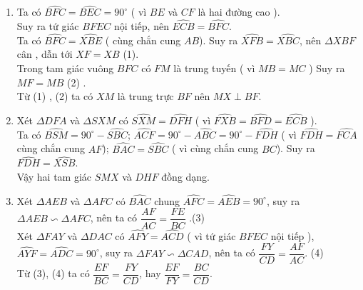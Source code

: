 \begin{ex}
{\begin{center}
\begin{tikzpicture}
    \end{tikzpicture}
    \end{center}
  \begin{enumerate}
  \item Ta có $\widehat{ BFC} = \widehat{ BEC} = 90^\circ$ ( vì $BE$ và $CF$ là hai đường cao ).\\
Suy ra tứ giác $BFEC$ nội tiếp, nên $\widehat{ ECB} = \widehat{BFC}$.\\ 
Ta có  $\widehat{BFC} = \widehat{XBE}$ ( cùng chắn cung $AB$). 
Suy ra $\widehat{ XFB}= \widehat{ XBC}$, nên $\Delta XBF$ cân , dẫn tới $XF = XB$ \hfill (1).\\
Trong tam giác vuông $BFC$ có $FM$ là trung tuyến ( vì $MB = MC$ )
 Suy ra $MF = MB$ \hfill (2) .\\
Từ (1) , (2) ta  có $XM$ là trung trực $BF$ nên $MX \perp BF$.
\item  Xét $\Delta DFA$ và $\Delta SXM$ có $\widehat{SXM}  = \widehat{ DFH}$ ( vì $\widehat{FXB} = \widehat{ BFD} = \widehat{ECB}$ ).\\
 Ta có $\widehat{BSM} = 90^\circ - \widehat{ SBC}$; 
     $\widehat{ ACF} = 90^\circ - \widehat{ ABC}  = 90^\circ - \widehat{ FDH}$ ( vì $\widehat{ FDH} =\widehat{ FCA}$ cùng chắn cung $AF$);
$  \widehat{BAC} = \widehat{ SBC}$ ( vì cùng chắn cung $BC$).
Suy ra  $\widehat{ FDH} = \widehat{XSB}$. \\ Vậy hai tam giác $SMX$ và $DHF$ đồng dạng.
\item Xét $\Delta{AEB}$ và $\Delta{AFC}$ có $\widehat{ BAC}$ chung 
$\widehat{AFC} = \widehat{AEB} = 90^\circ$, suy ra $\Delta AEB  \backsim \Delta AFC$, nên ta có $\dfrac{AF}{AC}=\dfrac{FE}{BC}$ .\hfill (3)\\
Xét $\Delta FAY$ và $\Delta DAC$ có $\widehat{ AFY} = \widehat{ ACD}$ ( vì tứ giác $BFEC$ nội tiếp ), $\widehat{AYF} = \widehat{ADC} = 90^\circ$, suy ra  
$\Delta FAY  \backsim \Delta CAD$, nên ta có $\dfrac{FY}{CD}=\dfrac{AF}{AC}$. \hfill (4)\\
 Từ (3), (4) ta có $\dfrac{EF}{BC}=\dfrac{FY}{CD}$, hay $\dfrac{EF}{FY}=\dfrac{BC}{CD}$.

  \end{enumerate}
  
    }
\end{ex}

